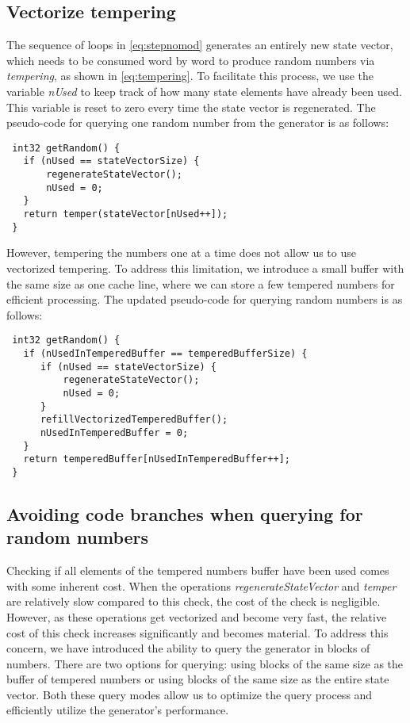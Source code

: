 \documentclass[preprint,1p,times]{elsarticle}
\begin{document}
\subsection{Vectorize tempering}
The sequence of loops in \eqref{eq:stepnomod} generates an entirely new state vector, which needs to be consumed word by word to produce random numbers via \textit{tempering}, as shown in \eqref{eq:tempering}. To facilitate this process, we use the variable \textit{nUsed} to keep track of how many state elements have already been used. This variable is reset to zero every time the state vector is regenerated. The pseudo-code for querying one random number from the generator is as follows:
\begin{verbatim}
 int32 getRandom() {
   if (nUsed == stateVectorSize) {
       regenerateStateVector();
       nUsed = 0;
   }
   return temper(stateVector[nUsed++]);
 }
\end{verbatim}
However, tempering the numbers one at a time does not allow us to use vectorized tempering. To address this limitation, we introduce a small buffer with the same size as one cache line, where we can store a few tempered numbers for efficient processing. The updated pseudo-code for querying random numbers is as follows:
\begin{verbatim}
 int32 getRandom() {
   if (nUsedInTemperedBuffer == temperedBufferSize) {
      if (nUsed == stateVectorSize) {
          regenerateStateVector();
          nUsed = 0;
      }
      refillVectorizedTemperedBuffer();
      nUsedInTemperedBuffer = 0;
   }
   return temperedBuffer[nUsedInTemperedBuffer++];
 }
\end{verbatim}
\subsection{Avoiding code branches when querying for random numbers}
\label{seq:blocks}
\noindent Checking if all elements of the tempered numbers buffer have been used comes with some inherent cost. When the operations \textit{regenerateStateVector} and \textit{temper} are relatively slow compared to this check, the cost of the check is negligible. However, as these operations get vectorized and become very fast, the relative cost of this check increases significantly and becomes material. To address this concern, we have introduced the ability to query the generator in blocks of numbers. There are two options for querying: using blocks of the same size as the buffer of tempered numbers or using blocks of the same size as the entire state vector. Both these query modes allow us to optimize the query process and efficiently utilize the generator's performance.
\end{document}
